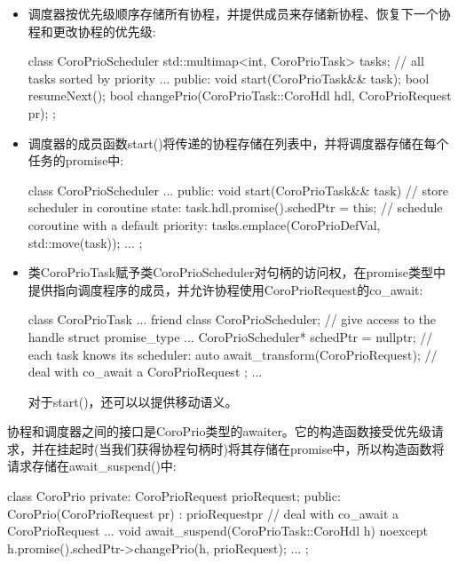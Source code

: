\begin{itemize}
\item 
调度器按优先级顺序存储所有协程，并提供成员来存储新协程、恢复下一个协程和更改协程的优先级:

\begin{cpp}
class CoroPrioScheduler
{
	std::multimap<int, CoroPrioTask> tasks; // all tasks sorted by priority
	...
	public:
	void start(CoroPrioTask&& task);
	bool resumeNext();
	bool changePrio(CoroPrioTask::CoroHdl hdl, CoroPrioRequest pr);
};
\end{cpp}

\item 
调度器的成员函数start()将传递的协程存储在列表中，并将调度器存储在每个任务的promise中:

\begin{cpp}
class CoroPrioScheduler
{
	...
	public:
	void start(CoroPrioTask&& task) {
		// store scheduler in coroutine state:
		task.hdl.promise().schedPtr = this;
		// schedule coroutine with a default priority:
		tasks.emplace(CoroPrioDefVal, std::move(task));
	}
	...
};
\end{cpp}

\item 
类CoroPrioTask赋予类CoroPrioScheduler对句柄的访问权，在promise类型中提供指向调度程序的成员，并允许协程使用CoroPrioRequest的co\_await:

\begin{cpp}
class CoroPrioTask {
	...
	friend class CoroPrioScheduler; // give access to the handle
	struct promise_type {
		...
		CoroPrioScheduler* schedPtr = nullptr; // each task knows its scheduler:
		auto await_transform(CoroPrioRequest); // deal with co_await a CoroPrioRequest
	};
	...
}
\end{cpp}

对于start()，还可以以提供移动语义。

\end{itemize}

协程和调度器之间的接口是CoroPrio类型的awaiter。它的构造函数接受优先级请求，并在挂起时(当我们获得协程句柄时)将其存储在promise中，所以构造函数将请求存储在await\_suspend()中:

\begin{cpp}
class CoroPrio {
private:
	CoroPrioRequest prioRequest;
public:
	CoroPrio(CoroPrioRequest pr)
	: prioRequest{pr} { // deal with co_await a CoroPrioRequest
	}
	...
	void await_suspend(CoroPrioTask::CoroHdl h) noexcept {
		h.promise().schedPtr->changePrio(h, prioRequest);
	}
	...
};
\end{cpp}

